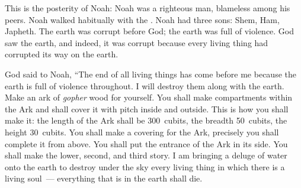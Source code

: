 \begin{inparaenum}
   This is the posterity of Noah: Noah was a righteous man, blameless among his peers. Noah walked habitually with the \lord.%
   Noah had three sons: Shem, Ham, Japheth.%
   The earth was corrupt before God; the earth was full of violence.%
   God saw the earth, and indeed, it was corrupt because every living thing had corrupted its way on the earth.%

   God said to Noah, ``The end of all living things has come before me because the earth is full of violence throughout. I will destroy them along with the earth.%
   Make an ark of \textit{gopher} wood for yourself. You shall make compartments within the Ark and shall cover it with pitch inside and outside.%
   This is how you shall make it: the length of the Ark shall be 300~cubits, the breadth 50~cubits, the height 30~cubits.%
   You shall make a covering for the Ark, precisely you shall complete it from above. You shall put the entrance of the Ark in its side. You shall make the lower, second, and third story.\understood{}%
   I am bringing a deluge of water onto the earth to destroy under the sky every living thing in which there is a living soul~--- everything that is in the earth shall die.%

\end{inparaenum}
